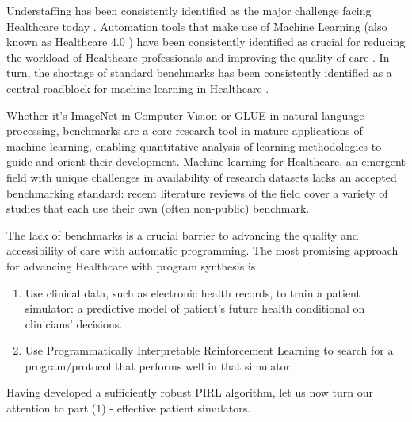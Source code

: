 Understaffing has been consistently identified as the major challenge facing Healthcare today \cite{ashleyy.metcalfHospitalUnitUnderstaffing2016,SurveyShowsHidden1993,UnderstaffingSignificantIssue2012,campbell_universal_2013, hudsonUnderstaffing2015, mercerMessageEditorinChief2008, r.stanleyUnderstaffedOverwhelmed2010, munnUnderstaffingWardsCompromising2017, thelancetHealthcareSystemStaffing2018}. Automation tools that make use of Machine Learning (also known as Healthcare 4.0 \cite{tortorellaHealthcareTrendsChallenges2020}) have been consistently identified as crucial for reducing the workload of Healthcare professionals and improving the quality of care \cite{agrawalMachineLearningHealthcare2020, deviDesignImplementationAdvanced2022, g.kumarSurveyMachineLearning2016, ganguliMachineLearningPursuit2020, maityMachineLearningImproved2017, mitraMachineLearningHealthcare2021, pianykhImprovingHealthcareOperations2020, xhaferraRoleMachineLearning2022}. In turn, the shortage of standard benchmarks has been consistently identified as a central roadblock for machine learning in Healthcare \cite{Crown2015Potential, David2020Evaluating, Gu2023Beyond, Harutyunyan2019Multitask, Kathrin2022Benchmark, liventsevEffectivePatientSimulators2021, McDermott2021Reproducibility, Purushotham2018Benchmarking, S2017Benchmark}.

Whether it's ImageNet \cite{dengImagenetLargescaleHierarchical2009} in Computer Vision or GLUE \cite{wangGLUEMultitaskBenchmark2018} in natural language processing, benchmarks are a core research tool in mature applications of machine learning, enabling quantitative analysis of learning methodologies to guide and orient their development.
Machine learning for Healthcare, an emergent field with unique challenges in availability of research datasets \cite{Anshik2021Handling, Gilbert2015market, Pahwa2021Big, Yazhini2019State} lacks an accepted benchmarking standard: recent literature reviews \cite{palMachineLearningHealthcare2023,tortorellaHealthcareTrendsChallenges2020} of the field cover a variety of studies that each use their own (often non-public) benchmark.

The lack of benchmarks is a crucial barrier to advancing the quality and accessibility of care with automatic programming. 
The most promising approach for advancing Healthcare with program synthesis is
\begin{enumerate}
    \item Use clinical data, such as electronic health records, to train a patient simulator: a predictive model of patient’s future health conditional on clinicians’ decisions. 
    \item Use Programmatically Interpretable Reinforcement Learning to search for a program/protocol that performs well in that simulator.
\end{enumerate}

Having developed a sufficiently robust PIRL algorithm, let us now turn our attention to part (1) - effective patient simulators.